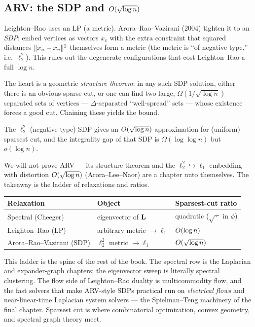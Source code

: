 \subsection{ARV: the SDP and $O(\sqrt{\log n})$}

\begin{intuitionbox}
Leighton--Rao uses an LP (a metric). Arora--Rao--Vazirani (2004) tighten it to an \emph{SDP}: embed
vertices as vectors $x_v$ with the extra constraint that squared distances $\lVert x_u-x_v\rVert^2$
themselves form a metric (the metric is ``of negative type,'' i.e.\ $\ell_2^2$). This rules out the
degenerate configurations that cost Leighton--Rao a full $\log n$.

The heart is a geometric \emph{structure theorem}: in any such SDP solution, either there is an
obvious sparse cut, or one can find two large, $\Omega(1/\sqrt{\log n})$-separated sets of vertices
--- $\Delta$-separated ``well-spread'' sets --- whose existence forces a good cut. Chaining these
yields the bound.
\end{intuitionbox}

\begin{theorem}\label{ch38:thm-arv}
The $\ell_2^2$ (negative-type) SDP gives an $O(\sqrt{\log n})$-approximation for (uniform) sparsest
cut, and the integrality gap of that SDP is $\Omega(\log\log n)$ but $o(\log n)$.
\end{theorem}

We will not prove ARV --- its structure theorem and the
$\ell_2^2\!\hookrightarrow\!\ell_1$ embedding with distortion $O(\sqrt{\log n})$ (Arora--Lee--Naor)
are a chapter unto themselves. The takeaway is the ladder of relaxations and ratios.

\begin{center}
\begin{tabular}{lll}
\toprule
Relaxation & Object & Sparsest-cut ratio \\
\midrule
Spectral (Cheeger) & eigenvector of $\mathbf{L}$ & quadratic ($\sqrt{\,\cdot\,}$ in $\phi$) \\
Leighton--Rao (LP) & arbitrary metric $\to\ell_1$ & $O(\log n)$ \\
Arora--Rao--Vazirani (SDP) & $\ell_2^2$ metric $\to\ell_1$ & $O(\sqrt{\log n})$ \\
\bottomrule
\end{tabular}
\end{center}

\begin{connectionbox}
This ladder is the spine of the rest of the book. The spectral row is the Laplacian and
expander-graph chapters; the eigenvector sweep is literally spectral clustering. The flow side of
Leighton--Rao duality is multicommodity flow, and the fast solvers that make ARV-style SDPs practical
run on \emph{electrical flows} and near-linear-time Laplacian system solvers --- the Spielman--Teng
machinery of the final chapter. Sparsest cut is where combinatorial optimization, convex geometry, and
spectral graph theory meet.
\end{connectionbox}

